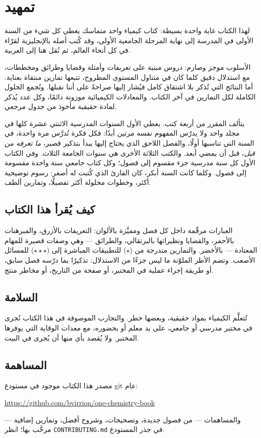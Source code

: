 \chapter{تمهيد}

لهذا الكتاب غاية واحدة بسيطة: كتاب كيمياء واحد متماسك يغطي كل شيء من
السنة الأولى في المدرسة إلى نهاية المرحلة الجامعية الأولى، وقد كُتب أصله
بالإنجليزية لقرّاء في كل أنحاء العالم، ثم نُقل هنا إلى العربية.

الأسلوب موجز وصارم: دروس مبنية على تعريفات وأمثلة وقضايا وطرائق
ومخططات، مع استدلال دقيق كلما كان في متناول المستوى المطروح، تتبعها تمارين
منتقاة بعناية. أما النتائج التي تُذكر بلا اشتقاق كامل فيُشار إليها صراحةً على
أننا نقبلها. وتُجمع الحلول الكاملة لكل التمارين في آخر الكتاب.
والمعادلات الكيميائية موزونة دائمًا، وكل عدد يُذكر لمادة حقيقية
مأخوذ من جدول مرجعي.

يتألف المقرر من أربعة كتب. يغطي الأول السنوات المدرسية الاثنتي عشرة كلها
في مجلد واحد ولا يدرّس المفهوم نفسه مرتين أبدًا: فكل فكرة
تُدرَّس مرة واحدة، في السنة التي تناسبها أولًا، والفصل اللاحق الذي
يحتاج إليها يبدأ بتذكير قصير، \emph{ما تعرفه من قبل}، قبل أن يمضي
أبعد. والكتب الثلاثة الأخرى هي سنوات الجامعة الثلاث.
وفي الكتاب الأول كل سنة مدرسية جزء مقسوم إلى فصول؛ وكل كتاب
جامعي سنة واحدة مقسومة إلى فصول. وكلما كانت السنة أبكر، كان القارئ الذي كُتبت
له أصغر: رسوم توضيحية أكثر، وخطوات محلولة أكثر تفصيلًا، وتمارين
ألطف.

\section*{كيف يُقرأ هذا الكتاب}

العبارات مرقّمة داخل كل فصل ومميَّزة بالألوان: التعريفات
بالأزرق، والمبرهنات بالأحمر، والقضايا ونظيراتها بالبرتقالي،
والطرائق --- وهي وصفات قصيرة للمهام المعتادة --- بالأخضر. والتمارين
متدرجة من ($\star$) للتطبيقات المباشرة إلى ($\star\star\star$) للمسائل
الأصعب. وتضم الأطر الملوّنة ما ليس جزءًا من الاستدلال: تذكيرًا
بما درّسه فصل سابق، أو طريقة إجراء عملية في
المختبر، أو صفحة من التاريخ، أو مخاطر منتج.

\section*{السلامة}

تُتعلَّم الكيمياء بمواد حقيقية، وبعضها خطر.
والتجارب الموصوفة في هذا الكتاب تُجرى في مختبر مدرسي أو
جامعي، على يد معلم أو بحضوره، مع معدات الوقاية
التي يوفرها المختبر. ولا يُقصد بأي منها أن يُجرى في
البيت.

\section*{المساهمة}

مصدر هذا الكتاب موجود في مستودع git عام:
\begin{center}
\url{https://github.com/bvirrion/one-chemistry-book}
\end{center}
والمساهمات --- من فصول جديدة، وتصحيحات، وشروح أفضل،
وتمارين إضافية --- مرحَّب بها؛ انظر \texttt{CONTRIBUTING.md} في
جذر المستودع.
